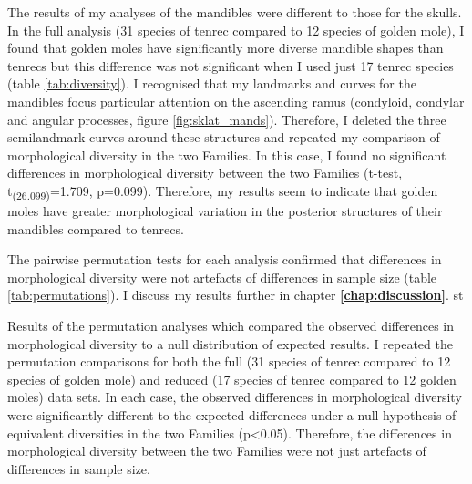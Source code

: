 	The results of my analyses of the mandibles were different to those for the skulls. In the full analysis (31 species of tenrec compared to 12 species of golden mole), I found that golden moles have significantly more diverse mandible shapes than tenrecs but this difference was not significant when I used just 17 tenrec species (table \ref{tab:diversity}). 
	I recognised that my landmarks and curves for the mandibles focus particular attention on the ascending ramus (condyloid, condylar and angular processes, figure \ref{fig:sklat_mands}). Therefore, I  deleted the three semilandmark curves around these structures and repeated my comparison of morphological diversity in the two Families. In this case, I found no significant differences in morphological diversity between the two Families (t-test, t\textsubscript{(26.099)}=1.709, p=0.099). Therefore, my results seem to indicate that golden moles have greater morphological variation in the posterior structures of their mandibles compared to tenrecs.
	
	The pairwise permutation tests for each analysis confirmed that differences in morphological diversity were not artefacts of differences in sample size (table \ref{tab:permutations}). I discuss my results further in chapter \textbf{\ref{chap:discussion}}.
	st
\begin{table}[!htbp]			
	\caption[Results of the permutation tests]{Results of the permutation analyses which compared the observed differences in morphological diversity to a null distribution of expected results. I repeated the permutation comparisons for both the full (31 species of tenrec compared to 12 species of golden mole) and reduced (17 species of tenrec compared to 12 golden moles) data sets. In each case, the observed differences in morphological diversity were significantly different to the expected differences under a null hypothesis of equivalent diversities in the two Families (p<0.05). Therefore, the differences in morphological diversity between the two Families were not just artefacts of differences in sample size.}
	 
	\label{tab:permutations}  
\end{table}
	


	
	





